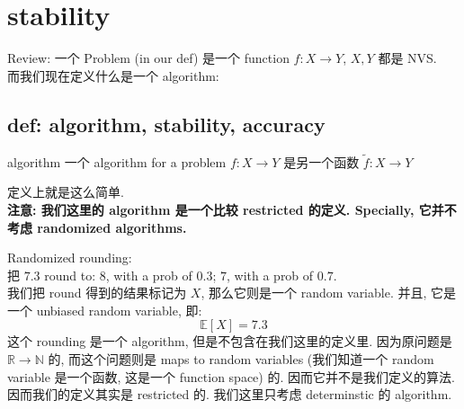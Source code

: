 \section{stability}
Review: 一个 Problem (in our def) 是一个 function $f:X \to Y$, $X,Y$ 都是 NVS.\\
而我们现在定义什么是一个 algorithm:
\subsection{def: algorithm, stability, accuracy}
\begin{definition}{algorithm}
    一个 algorithm for a problem $f:X\to Y$ 是另一个函数 $\tilde{f}:X \to Y$
\end{definition}
定义上就是这么简单.\\
\textbf{注意: 我们这里的 algorithm 是一个比较 restricted 的定义. Specially, 它并不考虑 randomized algorithms.}
\begin{example}
    Randomized rounding: \\
    把 $7.3$ round to: 8, with a prob of $0.3$;  $7$, with a prob of $0.7$.\\
    我们把 round 得到的结果标记为 $X$, 那么它则是一个 random variable. 并且, 它是一个 unbiased random variable, 即: \[
    \mathbb{E}[X] = 7.3
    \]
    这个 rounding 是一个 algorithm, 但是不包含在我们这里的定义里. 因为原问题是 $\mathbb{R}\to \mathbb{N}$ 的, 而这个问题则是 maps to random variables (我们知道一个 random variable 是一个函数, 这是一个 function space) 的. 因而它并不是我们定义的算法.\\
    因而我们的定义其实是 restricted 的. 我们这里只考虑 determinstic 的 algorithm.\\     
\end{example}




